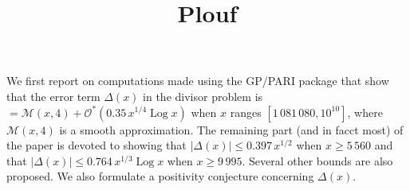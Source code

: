 \documentclass[12pt]{article}
\title{Plouf
}
\author{
}
\def\Mscr{\mathcal{M}}
\def\Ocal{\mathcal{O}}
\newcommand{\Log}{\mathop{\textrm{Log}}}
\begin{document}
%
%
We first report on computations made using the GP/PARI package that show
  that the error term $\Delta(x)$ in the divisor problem is
  $=\Mscr(x,4)+\Ocal^*(0.35\, x^{1/4}\Log x)$ when $x$ ranges $[1\,081\,080,
  10^{10}]$, where $\Mscr(x,4)$ is a smooth approximation. The remaining part
  (and in facct most) of the paper is devoted to showing that $|\Delta(x)|\le
  0.397\, {x^{1/2}}$ when $x\ge 5\,560$ and that $|\Delta(x)|\le 0.764\,
  {x^{1/3}\Log x}$ when $x\ge 9\,995$. Several other bounds are also proposed.
  We also formulate a positivity conjecture concerning $\Delta(x)$.
\end{document}
